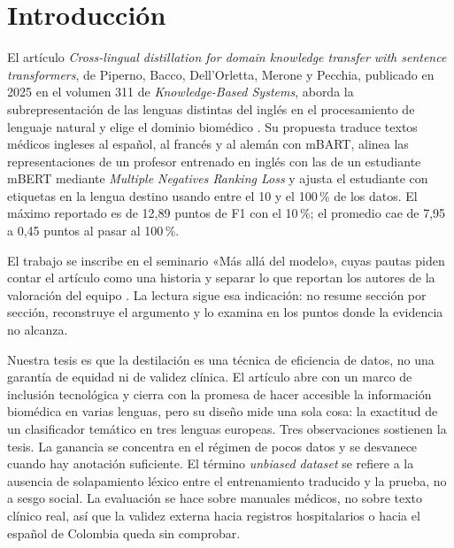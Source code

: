 \section{Introducción}
\label{sec:introduccion}

El artículo \emph{Cross-lingual distillation for domain knowledge transfer with sentence transformers}, de Piperno, Bacco, Dell'Orletta, Merone y Pecchia, publicado en 2025 en el volumen 311 de \emph{Knowledge-Based Systems}, aborda la subrepresentación de las lenguas distintas del inglés en el procesamiento de lenguaje natural y elige el dominio biomédico \cite{piperno2025}. Su propuesta traduce textos médicos ingleses al español, al francés y al alemán con mBART, alinea las representaciones de un profesor entrenado en inglés con las de un estudiante mBERT mediante \emph{Multiple Negatives Ranking Loss} y ajusta el estudiante con etiquetas en la lengua destino usando entre el 10 y el 100\,\% de los datos. El máximo reportado es de 12,89 puntos de F1 con el 10\,\%; el promedio cae de 7,95 a 0,45 puntos al pasar al 100\,\%.

El trabajo se inscribe en el seminario «Más allá del modelo», cuyas pautas piden contar el artículo como una historia y separar lo que reportan los autores de la valoración del equipo \cite{moreno2026}. La lectura sigue esa indicación: no resume sección por sección, reconstruye el argumento y lo examina en los puntos donde la evidencia no alcanza.

Nuestra tesis es que la destilación es una técnica de eficiencia de datos, no una garantía de equidad ni de validez clínica. El artículo abre con un marco de inclusión tecnológica y cierra con la promesa de hacer accesible la información biomédica en varias lenguas, pero su diseño mide una sola cosa: la exactitud de un clasificador temático en tres lenguas europeas. Tres observaciones sostienen la tesis. La ganancia se concentra en el régimen de pocos datos y se desvanece cuando hay anotación suficiente. El término \emph{unbiased dataset} se refiere a la ausencia de solapamiento léxico entre el entrenamiento traducido y la prueba, no a sesgo social. La evaluación se hace sobre manuales médicos, no sobre texto clínico real, así que la validez externa hacia registros hospitalarios o hacia el español de Colombia queda sin comprobar.

